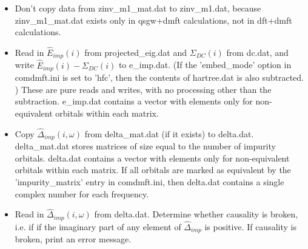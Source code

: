 \documentclass[aps,prb,singlecolumn,preprintnumbers,amsmath,amssymb]{revtex4}
\begin{document}
\begin{itemize}
 \item Don't copy data from zinv\_m1\_mat.dat to  zinv\_m1.dat, because zinv\_m1\_mat.dat exists only in qsgw+dmft calculations, not in dft+dmft calculations.

\item Read in $\hat{E}_{imp}(i)$ from projected\_eig.dat and $\Sigma_{DC}(i)$ from  dc.dat, and write $\hat{E}_{imp}(i)- \Sigma_{DC}(i)$ to e\_imp.dat. (If the 'embed\_mode' option in comdmft.ini is set to 'hfc', then the contents of hartree.dat is also subtracted. ) These are pure reads and writes, with no processing other than the subtraction.  e\_imp.dat contains  a vector with elements only for non-equivalent orbitals within each matrix.


\item Copy $\hat{\Delta}_{imp}(i,\omega)$ from delta\_mat.dat (if it exists) to delta.dat. 
 delta\_mat.dat stores matrices of size equal to the number of impurity orbitals. delta.dat contains  a vector with elements only for non-equivalent orbitals within each matrix. If all orbitals are marked as equivalent by  the 'impurity\_matrix' entry in comdmft.ini, then  delta.dat contains a single complex number for each frequency.

\item Read in  $\hat{\Delta}_{imp}(i,\omega)$ from delta.dat.  Determine whether causality is broken, i.e. if if the imaginary part of any element of $\hat{\Delta}_{imp}$ is positive. If causality is broken, print an error message.


\end{itemize}
\end{document}
